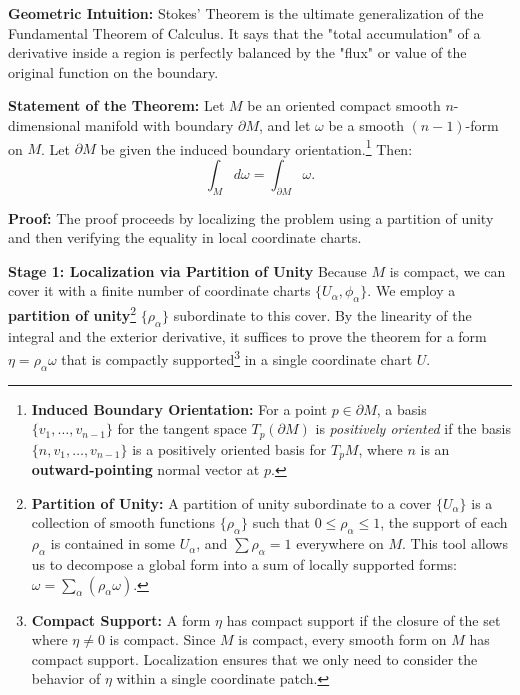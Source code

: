 \begin{solution}
\textbf{Geometric Intuition:} Stokes' Theorem is the ultimate generalization of the Fundamental Theorem of Calculus. It says that the "total accumulation" of a derivative inside a region is perfectly balanced by the "flux" or value of the original function on the boundary.

\textbf{Statement of the Theorem:}
Let $M$ be an oriented compact smooth $n$-dimensional manifold with boundary $\partial M$, and let $\omega$ be a smooth $(n-1)$-form on $M$. Let $\partial M$ be given the induced boundary orientation.\footnote{
\textbf{Induced Boundary Orientation:}
For a point $p \in \partial M$, a basis $\{v_1, \dots, v_{n-1}\}$ for the tangent space $T_p(\partial M)$ is \textit{positively oriented} if the basis $\{n, v_1, \dots, v_{n-1}\}$ is a positively oriented basis for $T_p M$, where $n$ is an \textbf{outward-pointing} normal vector at $p$.
} Then:
\[ \int_M d\omega = \int_{\partial M} \omega. \]

\textbf{Proof:}
The proof proceeds by localizing the problem using a partition of unity and then verifying the equality in local coordinate charts.

\textbf{Stage 1: Localization via Partition of Unity}
Because $M$ is compact, we can cover it with a finite number of coordinate charts $\{U_\alpha, \phi_\alpha\}$. We employ a \textbf{partition of unity}\footnote{
\textbf{Partition of Unity:}
A partition of unity subordinate to a cover $\{U_\alpha\}$ is a collection of smooth functions $\{\rho_\alpha\}$ such that $0 \le \rho_\alpha \le 1$, the support of each $\rho_\alpha$ is contained in some $U_\alpha$, and $\sum \rho_\alpha = 1$ everywhere on $M$. This tool allows us to decompose a global form into a sum of locally supported forms: $\omega = \sum_\alpha (\rho_\alpha \omega)$.
} $\{\rho_\alpha\}$ subordinate to this cover.
By the linearity of the integral and the exterior derivative, it suffices to prove the theorem for a form $\eta = \rho_\alpha \omega$ that is compactly supported\footnote{
\textbf{Compact Support:}
A form $\eta$ has compact support if the closure of the set where $\eta \neq 0$ is compact. Since $M$ is compact, every smooth form on $M$ has compact support. Localization ensures that we only need to consider the behavior of $\eta$ within a single coordinate patch.
} in a single coordinate chart $U$.


\end{solution}
